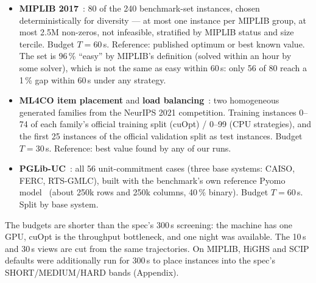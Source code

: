 \begin{itemize}
\item \textbf{MIPLIB 2017}~\citep{gleixner2021miplib}: 80 of the 240 benchmark-set instances, chosen
deterministically for diversity --- at most one instance per MIPLIB group, at most 2.5M non-zeros, not
infeasible, stratified by MIPLIB status and size tercile. Budget $T=60$\,s. Reference: published optimum or best
known value. The set is 96\,\% ``easy'' by MIPLIB's definition (solved within an hour by some solver), which is
not the same as easy within 60\,s: only 56 of 80 reach a 1\,\% gap within 60\,s under any strategy.
\item \textbf{ML4CO item placement} and \textbf{load balancing}~\citep{gasse2022ml4co}: two homogeneous
generated families from the NeurIPS 2021 competition. Training instances 0--74 of each family's official training
split (cuOpt) / 0--99 (CPU strategies), and the first 25 instances of the official validation split as test
instances. Budget $T=30$\,s. Reference: best value found by any of our runs.
\item \textbf{PGLib-UC}~\citep{pglibuc}: all 56 unit-commitment cases (three base systems: CAISO, FERC, RTS-GMLC),
built with the benchmark's own reference Pyomo model~\citep{knueven2020uc} (about 250k rows and 250k columns,
40\,\% binary). Budget $T=60$\,s. Split by base system.
\end{itemize}
The budgets are shorter than the spec's 300\,s screening: the machine has one GPU, cuOpt is the throughput
bottleneck, and one night was available. The 10\,s and 30\,s views are cut from the same trajectories. On MIPLIB,
HiGHS and SCIP defaults were additionally run for 300\,s to place instances into the spec's
SHORT/MEDIUM/HARD bands (Appendix).
